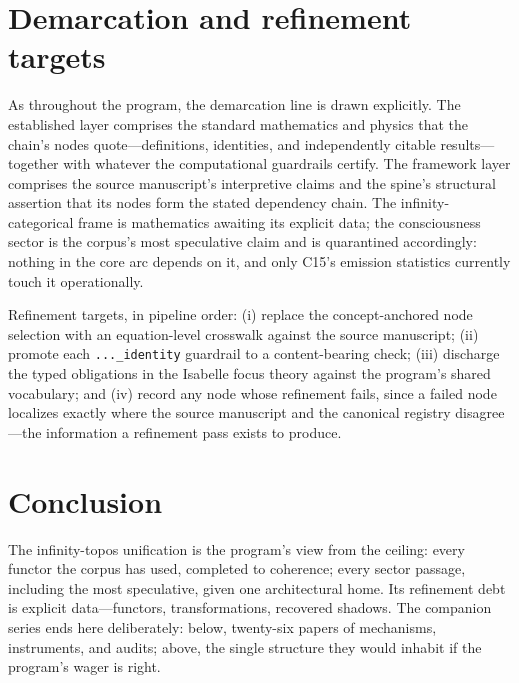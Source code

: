 \documentclass[11pt]{article}
\theoremstyle{remark}
\begin{document}
\section{Demarcation and refinement targets}
\label{sec:demarc}

As throughout the program, the demarcation line is drawn explicitly. The established layer comprises the standard mathematics and physics that the chain's nodes quote---definitions, identities, and independently citable results---together with whatever the computational guardrails certify. The framework layer comprises the source manuscript's interpretive claims and the spine's structural assertion that its nodes form the stated dependency chain. The infinity-categorical frame is mathematics awaiting its explicit data; the consciousness sector is the corpus's most speculative claim and is quarantined accordingly: nothing in the core arc depends on it, and only C15's emission statistics currently touch it operationally.

Refinement targets, in pipeline order: (i) replace the concept-anchored node selection with an equation-level crosswalk against the source manuscript; (ii) promote each \texttt{...\_identity} guardrail to a content-bearing check; (iii) discharge the typed obligations in the Isabelle focus theory against the program's shared vocabulary; and (iv) record any node whose refinement fails, since a failed node localizes exactly where the source manuscript and the canonical registry disagree---the information a refinement pass exists to produce.

\section{Conclusion}
\label{sec:conc}

The infinity-topos unification is the program's view from the ceiling: every functor the corpus has used, completed to coherence; every sector passage, including the most speculative, given one architectural home. Its refinement debt is explicit data---functors, transformations, recovered shadows. The companion series ends here deliberately: below, twenty-six papers of mechanisms, instruments, and audits; above, the single structure they would inhabit if the program's wager is right.
\end{document}
